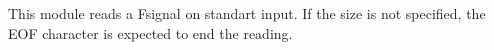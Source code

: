 This module reads a Fsignal on standart input. If the size is not
specified, the EOF character is expected to end the reading.

